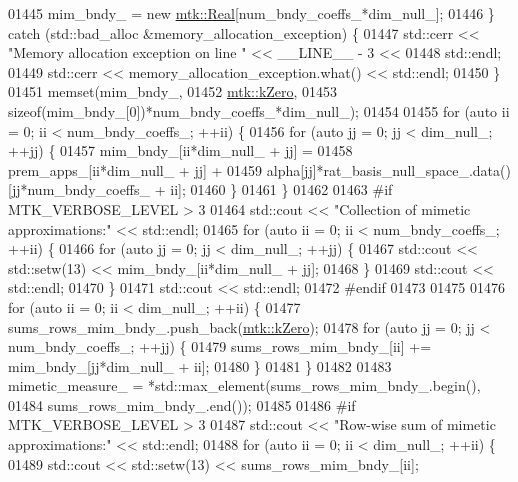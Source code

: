\begin{DoxyCode}
{{01445     mim\_bndy\_ = \textcolor{keyword}{new} \hyperlink{group__c01-roots_gac080bbbf5cbb5502c9f00405f894857d}{mtk::Real}[num\_bndy\_coeffs\_*dim\_null\_];
01446   \} \textcolor{keywordflow}{catch} (std::bad\_alloc &memory\_allocation\_exception) \{
01447     std::cerr << \textcolor{stringliteral}{"Memory allocation exception on line "} << \_\_LINE\_\_ - 3 <<
01448       std::endl;
01449     std::cerr << memory\_allocation\_exception.what() << std::endl;
01450   \}
01451   memset(mim\_bndy\_,
01452          \hyperlink{group__c01-roots_ga59a451a5fae30d59649bcda274fea271}{mtk::kZero},
01453          \textcolor{keyword}{sizeof}(mim\_bndy\_[0])*num\_bndy\_coeffs\_*dim\_null\_);
01454 
01455   \textcolor{keywordflow}{for} (\textcolor{keyword}{auto} ii = 0; ii < num\_bndy\_coeffs\_; ++ii) \{
01456     \textcolor{keywordflow}{for} (\textcolor{keyword}{auto} jj = 0; jj < dim\_null\_; ++jj) \{
01457       mim\_bndy\_[ii*dim\_null\_ + jj] =
01458         prem\_apps\_[ii*dim\_null\_ + jj] +
01459         alpha[jj]*rat\_basis\_null\_space\_.data()[jj*num\_bndy\_coeffs\_ + ii];
01460     \}
01461   \}
01462 
01463 \textcolor{preprocessor}{  #if MTK\_VERBOSE\_LEVEL > 3}
01464   std::cout << \textcolor{stringliteral}{"Collection of mimetic approximations:"} << std::endl;
01465   \textcolor{keywordflow}{for} (\textcolor{keyword}{auto} ii = 0; ii < num\_bndy\_coeffs\_; ++ii) \{
01466     \textcolor{keywordflow}{for} (\textcolor{keyword}{auto} jj = 0; jj < dim\_null\_; ++jj) \{
01467       std::cout << std::setw(13) << mim\_bndy\_[ii*dim\_null\_ + jj];
01468     \}
01469     std::cout << std::endl;
01470   \}
01471   std::cout << std::endl;
01472 \textcolor{preprocessor}{  #endif}
01473 
01475 
01476   \textcolor{keywordflow}{for} (\textcolor{keyword}{auto} ii = 0; ii < dim\_null\_; ++ii) \{
01477     sums\_rows\_mim\_bndy\_.push\_back(\hyperlink{group__c01-roots_ga59a451a5fae30d59649bcda274fea271}{mtk::kZero});
01478     \textcolor{keywordflow}{for} (\textcolor{keyword}{auto} jj = 0; jj < num\_bndy\_coeffs\_; ++jj) \{
01479       sums\_rows\_mim\_bndy\_[ii] += mim\_bndy\_[jj*dim\_null\_ + ii];
01480     \}
01481   \}
01482 
01483     mimetic\_measure\_ = *std::max\_element(sums\_rows\_mim\_bndy\_.begin(),
01484                                       sums\_rows\_mim\_bndy\_.end());
01485 
01486 \textcolor{preprocessor}{  #if MTK\_VERBOSE\_LEVEL > 3}
01487   std::cout << \textcolor{stringliteral}{"Row-wise sum of mimetic approximations:"} << std::endl;
01488   \textcolor{keywordflow}{for} (\textcolor{keyword}{auto} ii = 0; ii < dim\_null\_; ++ii) \{
01489     std::cout << std::setw(13) << sums\_rows\_mim\_bndy\_[ii];
}}
\end{DoxyCode}
